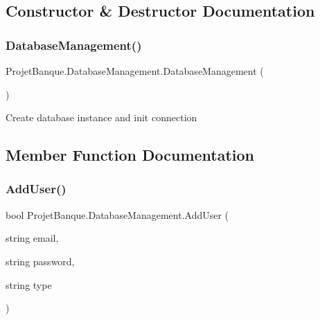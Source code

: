 \subsection{Constructor \& Destructor Documentation}
\mbox{\label{class_projet_banque_1_1_database_management_a595d794798b5b753d9d43c623a679abc}} 
\subsubsection{\texorpdfstring{DatabaseManagement()}{DatabaseManagement()}}
{\footnotesize\ttfamily Projet\+Banque.\+Database\+Management.\+Database\+Management (\begin{DoxyParamCaption}{ }\end{DoxyParamCaption})}



Create database instance and init connection 



\subsection{Member Function Documentation}
\mbox{\label{class_projet_banque_1_1_database_management_acf89f88775d4c333e5b17f76a4913530}} 
\subsubsection{\texorpdfstring{AddUser()}{AddUser()}\hspace{0.1cm}{\footnotesize\ttfamily [1/2]}}
{\footnotesize\ttfamily bool Projet\+Banque.\+Database\+Management.\+Add\+User (\begin{DoxyParamCaption}\item[{string}]{email,  }\item[{string}]{password,  }\item[{string}]{type }\end{DoxyParamCaption})}



